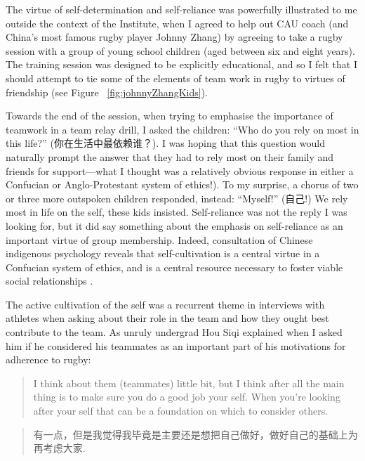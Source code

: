\begin{CJK}{UTF8}{gbsn}

The virtue of self-determination and self-reliance was powerfully illustrated to me outside the context of the Institute, when I agreed to help out CAU coach (and China's most famous rugby player Johnny Zhang) by agreeing to take a rugby session with a group of young school children (aged between six and eight years).  The training session was designed to be explicitly educational, and so I felt that I should attempt to tie some of the elements of team work in rugby to virtues of friendship (see Figure ~\ref{fig:johnnyZhangKids}).

Towards the end of the session, when trying to emphasise the importance of teamwork in a team relay drill, I asked the children: ``Who do you rely on most in this life?'' (你在生活中最依赖谁？).  I was hoping that this question would naturally prompt the answer that they had to rely most on their family and friends for support---what I thought was a relatively obvious response in either a Confucian or Anglo-Protestant system of ethics!).  To my surprise, a chorus of two or three more outspoken children responded, instead: ``Myself!'' (自己!) We rely most in life on the self, these kids insisted. Self-reliance was not the reply I was looking for, but it did say something about the emphasis on self-reliance as an important virtue of group membership.  Indeed, consultation of Chinese indigenous psychology reveals that self-cultivation is a central virtue in a Confucian system of ethics, and is a central resource necessary to foster viable social relationships \citep{Liu2014}.

The active cultivation of the self was a recurrent theme in interviews with athletes when asking about their role in the team and how they ought best contribute to the team.  As unruly undergrad Hou Siqi explained when I asked him if he considered his teammates as an important part of his motivations for adherence to rugby:

\begin{quotation}
  I think about them (teammates) little bit, but I think after all the main thing is to make sure you do a good job your self.  When you're looking after your self that can be a foundation on which to consider others.
\end{quotation}

\begin{quotation}
  有一点，但是我觉得我毕竟是主要还是想把自己做好，做好自己的基础上为再考虑大家.
\end{quotation}


\end{CJK}
